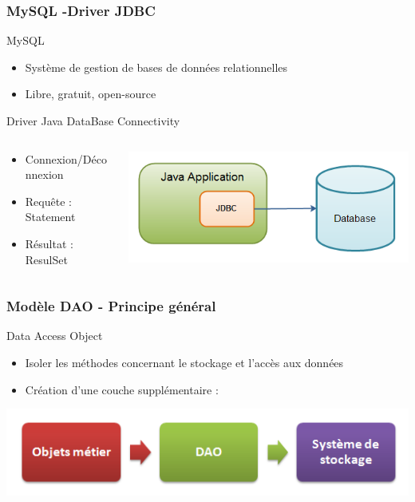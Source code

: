 \begin{frame}
    \frametitle{MySQL -Driver JDBC}
    \begin{block}{MySQL}
    	\begin{itemize}
    		\item Système de gestion de bases de données relationnelles
    		\item Libre, gratuit, open-source
    	\end{itemize}
    \end{block}
     \begin{block}{Driver Java DataBase Connectivity }
     	\begin{columns}
  				\begin{column}{5cm}
  					\begin{itemize}
  						\item Connexion/Déconnexion
  						\item Requête : Statement 
  						\item Résultat : ResulSet
  					\end{itemize}
  				\end{column}
  				\begin{column}{5cm}
  				      \includegraphics[scale=0.4]{images/jdbc.png}
  				\end{column}
  			\end{columns}

    \end{block}

\end{frame}

\begin{frame}
    \frametitle{Modèle DAO - Principe général}
    \begin{block}{Data Access Object}
    		\begin{itemize}
    			\item Isoler les méthodes concernant le stockage et l'accès aux données
    			\item Création d'une couche supplémentaire :
    		\end{itemize}
    		\center
    		\includegraphics[scale=0.5]{images/dao1.png}
	\end{block}

\end{frame}

